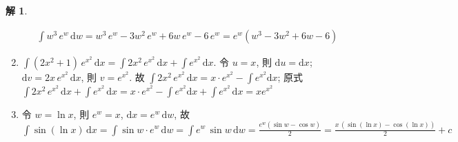 \documentclass[12pt]{extarticle}
\newcommand{\ds}{\displaystyle}
\theoremstyle{definition}
\newtheorem*{sol}{解}
\begin{document}
\begin{sol}
\begin{enumerate}
\begin{minipage}{0.15\textwidth}
  \end{minipage}
  \hspace{5mm}
  \begin{minipage}{0.8\textwidth}
    \begin{align*}
      \int w^3\,e^w\,\text{d}w = w^3\,e^w - 3w^2\,e^w + 6w\,e^w - 6\,e^w = e^w(w^3 - 3w^2 + 6w - 6)
    \end{align*}
  \end{minipage}
    \item $\ds\int(2x^2 + 1)\,e^{x^2}\,\text{d}x = \int\!2x^2\,e^{x^2}\,\text{d}x + \int\!e^{x^2}\,\text{d}x$. 令 $\ds u = x$, 則 $\ds\text{d}u = \text{d}x$; $\ds\text{d}v = 2x\,e^{x^2}\,\text{d}x$, 則 $\ds v = e^{x^2}$. 故 $\ds\int\!2x^2\,e^{x^2}\,\text{d}x = x\cdot e^{x^2} - \int\!e^{x^2}\text{d}x$; 原式 $\ds\int\!2x^2\,e^{x^2}\,\text{d}x + \int\!e^{x^2}\,\text{d}x = x\cdot e^{x^2} - \int\!e^{x^2}\text{d}x + \int\!e^{x^2}\,\text{d}x = xe^{x^2}$
    \item 令 $\ds w = \ln x$, 則 $\ds e^w = x$, $\ds\text{d}x = e^w\,\text{d}w$, 故 $\ds\int\!\sin(\ln x)\,\text{d}x = \int\!\sin w\cdot e^w\,\text{d}w = \int e^w\,\sin w\,\text{d}w = \frac{e^w(\sin w - \cos w)}{2} = \frac{x\,(\sin(\ln x) - \cos(\ln x))}{2} + c$ \\

\end{enumerate}
\end{sol}
\end{document}
